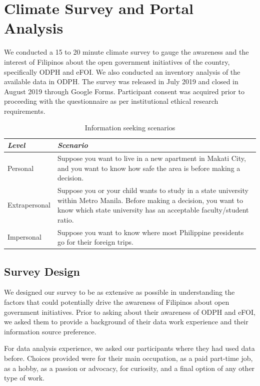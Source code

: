 \documentclass{sigchi}
\begin{document}
\section{Climate Survey and Portal Analysis}
We conducted a 15 to 20 minute climate survey to gauge the awareness and the interest of Filipinos about the open government initiatives of the country, specifically ODPH and eFOI. We also conducted an inventory analysis of the available data in ODPH. The survey was released in July 2019 and closed in August 2019 through Google Forms. Participant consent was acquired prior to proceeding with the questionnaire as per institutional ethical research requirements.

\begin{table}[t]
  \centering
  \begin{tabular}{l p{5.85cm}}
     \toprule
     \textbf{\textit{Level}} & \textbf{\textit{Scenario}} \\
     \midrule
     Personal & Suppose you want to live in a new apartment in Makati City, and you want to know how safe the area is before making a decision.\\
     \midrule
     Extrapersonal & Suppose you or your child wants to study in a state university within Metro Manila. Before making a decision, you want to know which state university has an acceptable faculty/student ratio.\\
     \midrule
     Impersonal & Suppose you want to know where most Philippine presidents go for their foreign trips.\\
     \bottomrule
  \end{tabular}
  \caption{Information seeking scenarios}
  \label{tab:scenarios}
\end{table}

\subsection{Survey Design}
We designed our survey to be as extensive as possible in understanding the factors that could potentially drive the awareness of Filipinos about open government initiatives. Prior to asking about their awareness of ODPH and eFOI, we asked them to provide a background of their data work experience and their information source preference. 

For data analysis experience, we asked our participants where they had used data before. Choices provided were for their main occupation, as a paid part-time job, as a hobby, as a passion or advocacy, for curiosity, and a final option of any other type of work.
\end{document}
